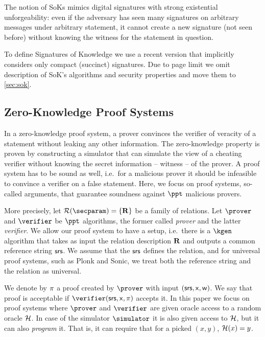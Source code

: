  The notion of SoKs mimics digital signatures with strong existential unforgeability: 
even if the adversary has seen many
signatures on arbitrary messages under arbitrary statement,  it cannot create a new signature (not seen before) without knowing the witness for the statement in question.

To define Signatures of Knowledge we use a recent version \cite{C:GroMal17} that implicitly considers only compact (succinct) signatures. Due to page limit we omit description of SoK's algorithms and security properties and move them to \cref{sec:sok}. 
     

  
  

\subsection{Zero-Knowledge Proof Systems}
In a zero-knowledge proof system, a prover convinces the verifier of veracity of a statement
without leaking any other information. The zero-knowledge property is proven by constructing a
simulator that can simulate the view of a cheating verifier without knowing the secret
information -- witness -- of the prover. A proof system has to be sound as well, i.e.~for a
malicious prover it should be infeasible to convince a verifier on a false statement. Here, we
focus on proof systems, so-called arguments, that guarantee soundness against $\ppt$ malicious provers.

More precisely, let $\RELGEN(\secparam) = \smallset{\REL}$ be a family of 
relations. Let $\prover$ and $\verifier$ be $\ppt$ algorithms, the former called \emph{prover}
and the latter \emph{verifier}. We allow our proof system to have a setup, i.e.~there is a
$\kgen$ algorithm that takes as input the relation description $\mathbf{R}$ and outputs a common
reference string $\mathsf{srs}$. We assume that the $\mathsf{srs}$ defines the relation, and for universal proof
systems, such as Plonk and Sonic, we treat both the reference string and the relation as
universal.

We denote by $\pi$ a proof created by $\prover$ with input
$(\mathsf{srs}, \mathsf{x}, \mathsf{w})$. We say that proof is acceptable if $\verifier (\srs, \inp, \zkproof)$ accepts it. In this paper we focus on proof systems where $\prover$ and $\verifier$ are given oracle access to a random oracle $\mathcal{H}$. In case of the simulator $\simulator$ it is also given access to $\mathcal{H}$, but it can also \emph{program} it. That is, it can require that for a picked $(x, y)$, $\mathcal{H} (x) = y$.

